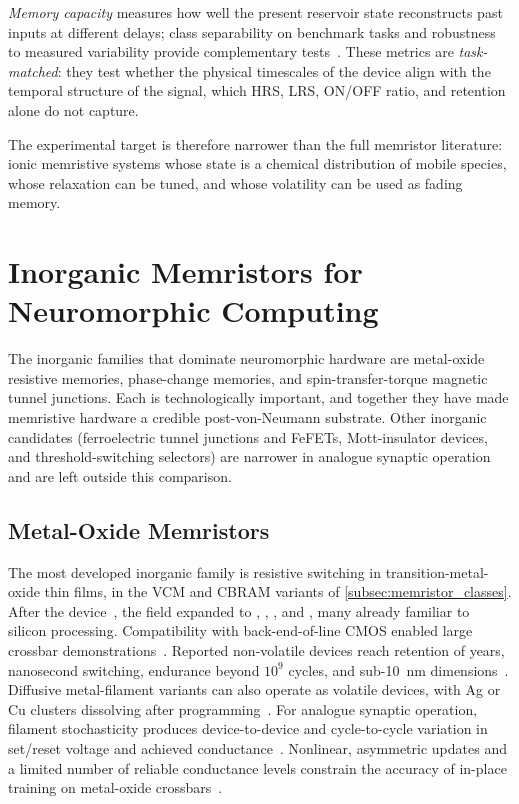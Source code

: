\documentclass[12pt, twoside]{report}
\begin{document}
\textit{Memory capacity} measures how well the present reservoir state reconstructs past inputs at different delays; class separability on benchmark tasks and robustness to measured variability provide complementary tests~\cite{Dambre2012}. These metrics are \textit{task-matched}: they test whether the physical timescales of the device align with the temporal structure of the signal, which HRS, LRS, ON/OFF ratio, and retention alone do not capture.

The experimental target is therefore narrower than the full memristor literature: ionic memristive systems whose state is a chemical distribution of mobile species, whose relaxation can be tuned, and whose volatility can be used as fading memory.


\section{Inorganic Memristors for Neuromorphic Computing}\label{sec:inorganic_memristors}

The inorganic families that dominate neuromorphic hardware are metal-oxide resistive memories, phase-change memories, and spin-transfer-torque magnetic tunnel junctions. Each is technologically important, and together they have made memristive hardware a credible post-von-Neumann substrate. Other inorganic candidates (ferroelectric tunnel junctions and FeFETs, Mott-insulator devices, and threshold-switching selectors) are narrower in analogue synaptic operation and are left outside this comparison.

\subsection{Metal-Oxide Memristors}\label{subsec:metal_oxide_memristors}

The most developed inorganic family is resistive switching in transition-metal-oxide thin films, in the VCM and CBRAM variants of \cref{subsec:memristor_classes}. After the  device~\cite{Strukov2008}, the field expanded to , , , and , many already familiar to silicon processing. Compatibility with back-end-of-line CMOS enabled large crossbar demonstrations~\cite{Prezioso2015, WaserAono2007, Valov2011}. Reported non-volatile devices reach retention of years, nanosecond switching, endurance beyond \(10^{9}\) cycles, and sub-\SI{10}{\nano\metre} dimensions~\cite{YangStrukovStewart2013, IelminiWong2018}. Diffusive metal-filament variants can also operate as volatile devices, with Ag or Cu clusters dissolving after programming~\cite{Ohno2011, Du2017, Midya2019, Zhong2021}. For analogue synaptic operation, filament stochasticity produces device-to-device and cycle-to-cycle variation in set/reset voltage and achieved conductance~\cite{Sun2019}. Nonlinear, asymmetric updates and a limited number of reliable conductance levels constrain the accuracy of in-place training on metal-oxide crossbars~\cite{IelminiWong2018}.
\end{document}
